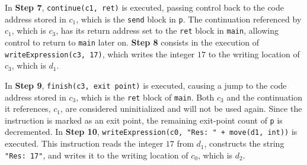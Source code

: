 In \textbf{Step 7}, \texttt{continue(c1, ret)} is executed, passing control back to the code address stored in $c_1$, which is the \texttt{send} block in \texttt{p}. The continuation referenced by $c_1$, which is $c_3$, has its return address set to the \texttt{ret} block in \texttt{main}, allowing control to return to \texttt{main} later on. \textbf{Step 8} consists in the execution of \texttt{writeExpression(c3, 17)}, which writes the integer $17$ to the writing location of $c_3$, which is $d_1$.

\begin{center}
\end{center}

In \textbf{Step 9}, \texttt{finish(c3, exit point)} is executed, causing a jump to the code address stored in $c_3$, which is the \texttt{ret} block of \texttt{main}. Both $c_3$ and the continuation it references, $c_1$, are considered uninitialized and will not be used again. Since the instruction is marked as an exit point, the remaining exit-point count of \texttt{p} is decremented. In \textbf{Step 10}, \texttt{writeExpression(c0, "Res:\ " + move(d1, int))} is executed. This instruction reads the integer $17$ from $d_1$, constructs the string \texttt{"Res:\ 17"}, and writes it to the writing location of $c_0$, which is $d_2$.

